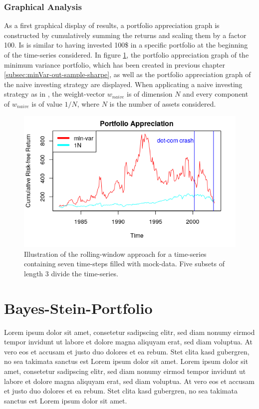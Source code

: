 \subsubsection{Graphical Analysis}
As a first graphical display of results, a portfolio appreciation graph is constructed by cumulatively summing the returns and scaling them by a factor 100. Is is similar to having invested 100\$ in a specific portfolio at the beginning of the time-series considered. In figure \ref{fig:appreciation_graph}, the portfolio appreciation graph of the minimum variance portfolio, which has been created in previous chapter \ref{subsec:minVar-out-sample-sharpe}, as well as the portfolio appreciation graph of the naive investing strategy are displayed. When applicating a naive investing strategy as in \cite{DEM09}, the weight-vector $w_{naive}$ is of dimension $N$ and every component of $w_{naive}$ is of value $1/N$, where $N$ is the number of assets considered.
\begin{figure}[h]
  \begin{center}
    \includegraphics[width=\textwidth]{Bilder/portfolio-appreciation.png}
    \caption{Illustration of the rolling-window approach for a time-series containing seven time-steps filled with mock-data. Five subsets of length 3 divide the time-series.}
    \label{fig:appreciation_graph}
  \end{center}
\end{figure}


\section{Bayes-Stein-Portfolio}
Lorem ipsum dolor sit amet, consetetur sadipscing elitr, sed diam nonumy eirmod tempor invidunt ut labore et dolore magna aliquyam erat, sed diam voluptua. At vero eos et accusam et justo duo dolores et ea rebum. Stet clita kasd gubergren, no sea takimata sanctus est Lorem ipsum dolor sit amet. Lorem ipsum dolor sit amet, consetetur sadipscing elitr, sed diam nonumy eirmod tempor invidunt ut labore et dolore magna aliquyam erat, sed diam voluptua. At vero eos et accusam et justo duo dolores et ea rebum. Stet clita kasd gubergren, no sea takimata sanctus est Lorem ipsum dolor sit amet.
